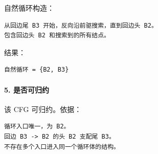 \documentclass[UTF8]{ctexart}
\begin{document}
自然循环构造：

\begin{Verbatim}[fontsize=\small,breaklines=true]
从回边尾 B3 开始，反向沿前驱搜索，直到回边头 B2。
包含回边头 B2 和搜索到的所有结点。
\end{Verbatim}

结果：

\begin{Verbatim}[fontsize=\small,breaklines=true]
自然循环 = {B2, B3}
\end{Verbatim}

\paragraph*{5. 是否可归约}

该 CFG 可归约。依据：

\begin{Verbatim}[fontsize=\small,breaklines=true]
循环入口唯一，为 B2。
回边 B3 -> B2 的头 B2 支配尾 B3。
不存在多个入口进入同一个循环体的结构。
\end{Verbatim}
\end{document}
